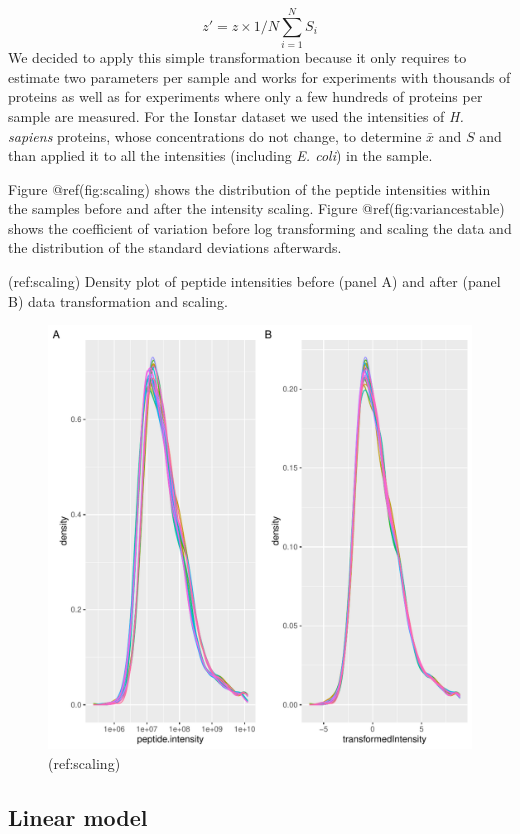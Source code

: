\documentclass[journal=jacsat,manuscript=article]{achemso}
\begin{document}
\[
z' = z \times 1/N\sum_{i=1}^N S_i
\] We decided to apply this simple transformation because it only
requires to estimate two parameters per sample and works for experiments
with thousands of proteins as well as for experiments where only a few
hundreds of proteins per sample are measured. For the Ionstar dataset we
used the intensities of \emph{H. sapiens} proteins, whose concentrations
do not change, to determine \(\bar{x}\) and \(S\) and than applied it to
all the intensities (including \emph{E. coli}) in the sample.

Figure @ref(fig:scaling) shows the distribution of the peptide
intensities within the samples before and after the intensity scaling.
Figure @ref(fig:variancestable) shows the coefficient of variation
before log transforming and scaling the data and the distribution of the
standard deviations afterwards.

(ref:scaling) Density plot of peptide intensities before (panel A) and
after (panel B) data transformation and scaling.

\begin{figure}
\centering
\includegraphics{Prolfqua_files/figure-latex/scaling-1.pdf}
\caption{(ref:scaling)}
\end{figure}

\hypertarget{linear-model}{%
\subsection{Linear model}\label{linear-model}}
\end{document}
